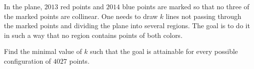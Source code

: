 In the plane, $2013$ red points and $2014$ blue points are marked so that no three of the marked points are collinear. One needs to draw $k$ lines not passing through the marked points and dividing the plane into several regions. The goal is to do it in such a way that no region contains points of both colors.

Find the minimal value of $k$ such that the goal is attainable for every possible configuration of $4027$ points.
